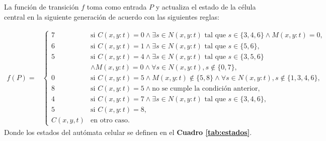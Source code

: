         La funci\'on de transici\'on \( f \) toma como entrada \(P\) y actualiza el estado de la c\'elula central en la 
            siguiente generaci\'on de acuerdo con las siguientes reglas:


    
        \begin{equation*}
                \begin{aligned}
                f(P) = & \begin{cases}
                    7 & \text{si } C(x, y: t) = 0 \land \exists s \in N(x, y: t) \text{ tal que } s \in \{3, 4, 6\} \land M(x, y: t) = 0, \\
                    6 & \text{si } C(x, y: t) = 1 \land \exists s \in N(x, y: t) \text{ tal que } s \in \{5, 6\}, \\
                    5 & \text{si } C(x, y: t) = 4 \land \exists s \in N(x, y: t) \text{ tal que } s \in \{3, 5, 6\} \\
                     &\land M(x, y: t) = 0 \land \forall s \in N(x, y: t), s \not\in \{0, 7\}, \\
                    0 & \text{si } C(x, y: t) = 5 \land M(x, y: t) \not\in \{5, 8\} \land \forall s \in N(x, y: t), s \not\in \{1, 3, 4, 6\}, \\
                    8 & \text{si } C(x, y: t) = 5 \land \text{no se cumple la condici\'on anterior}, \\
                    4 & \text{si } C(x, y: t) = 7 \land \exists s \in N(x, y: t) \text{ tal que } s \in \{3, 4, 6\}, \\
                    5 & \text{si } C(x, y: t) = 8, \\
                    C(x, y, t) & \text{en otro caso}.
                \end{cases}
                \end{aligned}
            \end{equation*}
    Donde los estados del aut\'omata celular se definen en el \textbf{Cuadro \ref{tab:estados}}.
    \vskip 0.5cm
